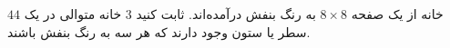 $44$
خانه از یک صفحه 
$8\times8$
 به رنگ بنفش درآمده‌اند. ثابت کنید 
$3$
 خانه متوالی در یک سطر یا ستون وجود دارند که هر سه به رنگ بنفش باشند.